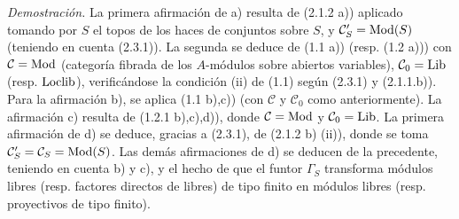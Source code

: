 \emph{Demostración.} La primera afirmación de a) resulta de (2.1.2 a)) aplicado tomando por $S$ el topos de los haces de conjuntos sobre $S$, y $\mathcal C'_S=\operatorname{Mod}(S)$ (teniendo en cuenta (2.3.1)). La segunda se deduce de (1.1 a)) (resp. (1.2 a))) con $\mathcal C=\operatorname{Mod}$ (categoría fibrada de los $A$-módulos sobre abiertos variables), $\mathcal C_0=\operatorname{Lib}$ (resp. $\operatorname{Loclib}$), verificándose la condición (ii) de (1.1) según (2.3.1) y (2.1.1.b)). Para la afirmación b), se aplica (1.1 b),c)) (con $\mathcal C$ y $\mathcal C_0$ como anteriormente). La afirmación c) resulta de (1.2.1 b),c),d)), donde $\mathcal C=\operatorname{Mod}$ y $\mathcal C_0=\operatorname{Lib}$. La primera afirmación de d) se deduce, gracias a (2.3.1), de (2.1.2 b) (ii)), donde se toma $\mathcal C'_S=\mathcal C_S=\operatorname{Mod}(S)$. Las demás afirmaciones de d) se deducen de la precedente, teniendo en cuenta b) y c), y el hecho de que el funtor $\Gamma_S$ transforma módulos libres (resp. factores directos de libres) de tipo finito en módulos libres (resp. proyectivos de tipo finito).

